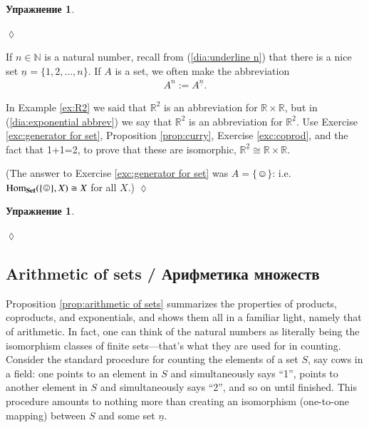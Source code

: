 \documentclass[a4paper]{book}
\def\tn{\textnormal}
\def\RR{{\mathbb R}}
\def\NN{{\mathbb N}}
\def\Hom{\tn{Hom}}
\def\singleton{\{\smiley\}}
\def\iso{\cong}
\def\ul{\underline}
\def\Set{{\bf Set}}
\theoremstyle{myth}
\newtheorem{excENG}[envENG]{\begin{english}Exercise\end{english}}
\newenvironment{exerciseENG}{\begin{excENG}}{\hspace*{\fill}$\lozenge$\end{excENG}}
\newtheorem{excRUS}[envRUS]{Упражнение}
\newenvironment{exerciseRUS}{\begin{excRUS}}{\hspace*{\fill}$\lozenge$\end{excRUS}}
\begin{document}
\begin{russian}
\begin{exerciseRUS}\label{exc:evaluation}
 
\end{exerciseRUS}

If $n\in\NN$ is a natural number, recall from (\ref{dia:underline n}) that there is a nice set $\ul{n}=\{1,2,\ldots,n\}$. If $A$ is a set, we often make the abbreviation 
\begin{align}\label{dia:exponential abbrev}
A^n:=A^{\ul{n}}.
\end{align}

 

\begin{exerciseENG}\label{exc:two R2s}
In Example \ref{ex:R2} we said that $\RR^2$ is an abbreviation for $\RR\times\RR$, but in (\ref{dia:exponential abbrev}) we say that $\RR^2$ is an abbreviation for $\RR^{\ul{2}}$. Use Exercise \ref{exc:generator for set}, Proposition \ref{prop:curry}, Exercise \ref{exc:coprod}, and the fact that 1+1=2, to prove that these are isomorphic, $\RR^{\ul{2}}\iso\RR\times\RR$.

(The answer to Exercise \ref{exc:generator for set} was $A=\singleton$: i.e. $\Hom_\Set(\singleton,X)\iso X$ for all $X$.)
\end{exerciseENG}

\begin{exerciseRUS}\label{exc:two R2s}
 
\end{exerciseRUS}


\subsection{Arithmetic of sets / Арифметика множеств}\label{sec:arithmetic of sets}

Proposition \ref{prop:arithmetic of sets} summarizes the properties of products, coproducts, and exponentials, and shows them all in a familiar light, namely that of arithmetic. In fact, one can think of the natural numbers as literally being the isomorphism classes of finite sets---that's what they are used for in counting. Consider the standard procedure for counting the elements of a set $S$, say cows in a field: one points to an element in $S$ and simultaneously says “1”, points to another element in $S$ and simultaneously says “2”, and so on until finished. This procedure amounts to nothing more than creating an isomorphism (one-to-one mapping) between $S$ and some set $\ul{n}$. 


\end{russian}
\end{document}
